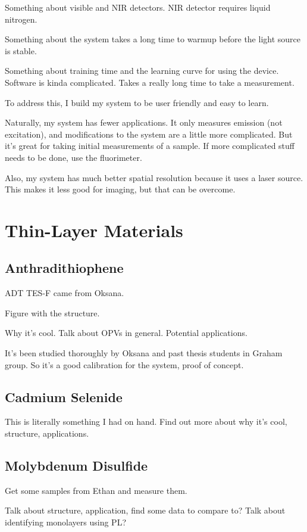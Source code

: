 Something about visible and NIR detectors. NIR detector requires liquid nitrogen.

Something about the system takes a long time to warmup before the light source is stable.

Something about training time and the learning curve for using the device. Software is kinda complicated. Takes a really long time to take a measurement.

To address this, I build my system to be user friendly and easy to learn.

Naturally, my system has fewer applications. It only measures emission (not excitation), and modifications to the system are a little more complicated. But it's great for taking initial measurements of a sample. If more complicated stuff needs to be done, use the fluorimeter.

Also, my system has much better spatial resolution because it uses a laser source. This makes it less good for imaging, but that can be overcome.


\section{Thin-Layer Materials}
\subsection{Anthradithiophene}
ADT TES-F came from Oksana.

Figure with the structure.

Why it's cool. Talk about OPVs in general. Potential applications.

It's been studied thoroughly by Oksana and past thesis students in Graham group. So it's a good calibration for the system, proof of concept.


\subsection{Cadmium Selenide}
This is literally something I had on hand. Find out more about why it's cool, structure, applications.


\subsection{Molybdenum Disulfide}
Get some samples from Ethan and measure them.

Talk about structure, application, find some data to compare to?
Talk about identifying monolayers using PL?